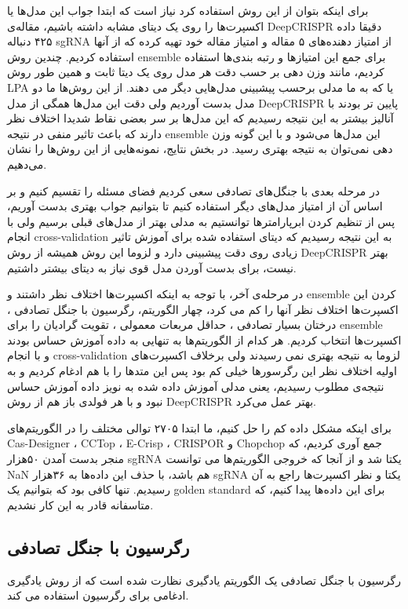 \documentclass[12pt,a4paper,BCOR=.7cm,headsepline,bibliography=totoc]{report}
\begin{document}
برای اینکه بتوان از این روش‌ استفاده کرد نیاز است که ابتدا جواب این مدل‌ها یا اکسپرت‌ها را روی یک دیتای مشابه داشته باشیم، مقاله‌ی DeepCRISPR دقیقا داده ۴۲۵ دنباله sgRNA از امتیاز دهنده‌های ۵ مقاله و امتیاز مقاله خود تهیه کرده که از آنها استفاده کردیم. چندین روش ensemble برای جمع این امتیاز‌ها و رتبه بندی‌ها استفاده کردیم، مانند وزن دهی بر حسب دقت هر مدل روی یک دیتا ثابت و همین طور روش‌ LPA یا  که به ما مدلی برحسب پیشبینی مدل‌هایی دیگر می دهند. از این روش‌ها ما دو مدل بدست آوردیم ولی دقت این مدل‌ها همگی از مدل DeepCRISPR پایین تر بودند با آنالیز بیشتر به این نتیجه رسیدیم که این مدل‌ها بر سر بعضی نقاط شدیدا اختلاف نظر دارند که باعث تاثیر منفی در نتیجه ensemble این مدل‌ها می‌شود و با این گونه وزن دهی نمی‌توان به نتیجه بهتری رسید. در بخش نتایج، نمونه‌هایی از این روش‌ها را نشان می‌دهیم.

در مرحله بعدی با جنگل‌های تصادفی سعی کردیم فضای مسئله را تقسیم کنیم و بر اساس آن از امتیاز مدل‌های دیگر استفاده کنیم تا بتوانیم جواب بهتری بدست آوریم، پس از تنظیم کردن ابرپارامترها توانستیم به مدلی بهتر از مدل‌های قبلی برسیم ولی با انجام cross-validation به این نتیجه رسیدیم که دیتای استفاده شده برای آموزش تاثیر زیادی روی دقت پیشبینی دارد و لزوما این روش همیشه از روش DeepCRISPR بهتر نیست، برای بدست آوردن مدل قوی نیاز به دیتای بیشتر داشتیم.

در مرحله‌ی آخر، با توجه به اینکه اکسپرت‌ها اختلاف نظر داشتند و ensemble کردن این اکسپرت‌ها اختلاف نظر آنها را کم می کرد،‌ چهار الگوریتم، رگرسیون با جنگل تصادفی ، درختان بسیار تصادفی ، حداقل مربعات معمولی ، تقویت گرادیان  را برای ensemble اکسپرت‌ها انتخاب کردیم. هر کدام از الگوریتم‌ها به تنهایی به داده آموزش حساس بودند و با انجام cross-validation لزوما به نتیجه بهتری نمی رسیدند ولی برخلاف اکسپرت‌‌های اولیه اختلاف نظر این رگرسورها خیلی کم بود پس این متد‌ها را با هم ادغام کردیم و به نتیجه‌ی مطلوب رسیدیم، یعنی مدلی آموزش داده شده به نویز داده آموزش حساس نبود و با هر فولدی باز‌ هم از روش DeepCRISPR بهتر عمل می‌کرد.

برای اینکه مشکل داده کم را حل کنیم، ما ابتدا ۲۷۰۵ توالی مختلف را در الگوریتم‌های
 Cas-Designer ، CCTop ، E-Crisp ، CRISPOR و Chopchop جمع آوری کردیم، که منجر بدست آمدن ۵۰هزار sgRNA یکتا شد و از آنجا که خروجی الگوریتم‌ها می توانست NaN هم باشد، با حذف این داده‌ها به ۳۶هزار sgRNA یکتا و نظر اکسپرت‌ها راجع به آن رسیدیم. تنها کافی بود که بتوانیم یک golden standard برای این داده‌ها پیدا کنیم، که متاسفانه قادر به این کار نشدیم. 
\subsection{رگرسیون با جنگل تصادفی}
رگرسیون با جنگل تصادفی \cite{Random Forests} یک الگوریتم یادگیری نظارت شده است که از روش یادگیری ادغامی برای رگرسیون استفاده می کند.
\end{document}

